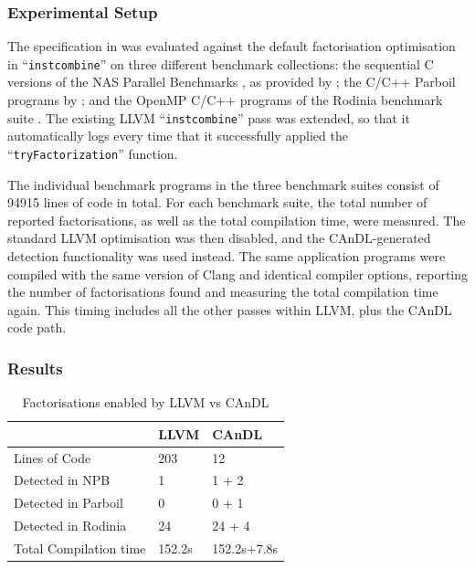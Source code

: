 \subsubsection{Experimental Setup}

    The specification in  was evaluated against the default
    factorisation optimisation in ``{\tt instcombine}'' on three different
    benchmark collections:
    the sequential C versions of the NAS Parallel Benchmarks
    \citep{Bailey1991NPB}, as provided by \citet{seo2011performance};
    the C/C++ Parboil programs by \citet{stratton2012parboil};
    and the OpenMP C/C++ programs of the Rodinia benchmark suite
    \citep{Che2009Rodinia}.
    The existing LLVM ``{\tt instcombine}'' pass was extended, so that it
    automatically logs every time that it successfully applied the
    ``{\tt tryFactorization}'' function.  

    The individual benchmark programs in the three benchmark
    suites consist of 94915 lines of code in total.
    For each benchmark suite, the total number of reported factorisations, as
    well as the total compilation time, were measured.
    The standard LLVM optimisation was then disabled, and the CAnDL-generated
    detection functionality was used instead.
    The same application programs were compiled with the same version of Clang
    and identical compiler options, reporting the number of factorisations
    found and measuring the total compilation time again.
    This timing includes all the other passes within LLVM, plus the CAnDL code
    path.

\subsubsection{Results}

\begin{table}[t]
  \centering
  \begin{tabular}{lll}
    \toprule
    & {\bf LLVM} & {\bf CAnDL} \\
    \midrule
    Lines of Code & 203 & 12 \\
    Detected in NPB & 1 & 1 + 2 \\
    Detected in Parboil & 0 & 0 + 1\\
    Detected in Rodinia & 24 & 24 + 4\\
    Total Compilation time & 152.2s & 152.2s+7.8s \\
    \bottomrule
\end{tabular}
\caption{Factorisations enabled by LLVM vs CAnDL}
\label{fig:factorization_results}
\end{table}

